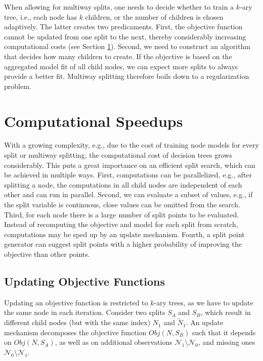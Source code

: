 \documentclass[a4paper, 11pt]{article}
\begin{document}
\par
When allowing for multiway splits, one needs to decide whether to train a $k$-ary tree, i.e., each node has $k$ children, or the number of children is chosen adaptively. The latter creates two predicaments. First, the objective function cannot be updated from one split to the next, thereby considerably increasing computational costs (see Section \ref{sec:computational_speedups}). Second, we need to construct an algorithm that decides how many children to create. If the objective is based on the aggregated model fit of all child nodes, we can expect more splits to always provide a better fit. Multiway splitting therefore boils down to a regularization problem.

\section{Computational Speedups}
\label{sec:computational_speedups}

With a growing complexity, e.g., due to the cost of training node models for every split or multiway splitting, the computational cost of decision trees grows considerably. This puts a great importance on an efficient split search, which can be achieved in multiple ways.
First, computations can be parallelized, e.g., after splitting a node, the computations in all child nodes are independent of each other and can run in parallel.
Second, we can evaluate a subset of values, e.g., if the split variable is continuous, close values can be omitted from the search.
Third, for each node there is a large number of split points to be evaluated. Instead of recomputing the objective and model for each split from scratch, computations may be sped up by an update mechanism. Fourth, a split point generator can suggest split points with a higher probability of improving the objective than other points.

\subsection{Updating Objective Functions}

Updating an objective function is restricted to $k$-ary trees, as we have to update the same node in each iteration. Consider two splits $S_A$ and $S_B$, which result in different child nodes (but with the same index) $N_1$ and $\tilde{N}_1$. An update mechanism decomposes the objective function $Obj(N, S_B)$ such that it depends on $Obj(N, S_A)$, as well as on additional observations $\mathcal{N}_1 \setminus \mathcal{N}_0$, and missing ones $\mathcal{N}_0 \setminus \mathcal{N}_1$. 
\end{document}
